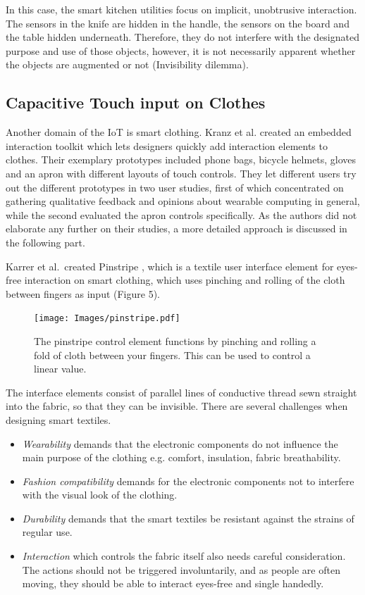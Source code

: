 In this case, the smart kitchen utilities focus on implicit, unobtrusive interaction.
The sensors in the knife are hidden in the handle, the sensors on the board and the table hidden underneath.
Therefore, they do not interfere with the designated purpose and use of those objects, however, it is not necessarily apparent whether the objects are augmented or not (Invisibility dilemma).

\subsection{Capacitive Touch input on Clothes}
\label{sec:touchInputOnClothes}
Another domain of the IoT is smart clothing. 
Kranz et al. created an embedded interaction toolkit which lets designers quickly add interaction elements to clothes.
Their exemplary prototypes included phone bags, bicycle helmets, gloves and an apron with different layouts of touch controls.
They let different users try out the different prototypes in two user studies, first of which concentrated on gathering qualitative feedback and opinions about wearable computing in general, while the second evaluated the apron controls specifically.
As the authors did not elaborate any further on their studies, a more detailed approach is discussed in the following part.

Karrer et al.\ created Pinstripe \cite{karrer11}, which is a textile user interface element for eyes-free interaction on smart clothing, which uses pinching and rolling of the cloth between fingers as input (Figure 5).
\begin{figure}[!t]
	\centering
	\texttt{[image: Images/pinstripe.pdf]}
	\caption{The pinstripe control element functions by pinching and rolling a fold of cloth between your fingers. This can be used to control a linear value. \cite{karrer11}}
	\label{fig:pinstripe}
\end{figure}
The interface elements consist of parallel lines of conductive thread sewn straight into the fabric, so that they can be invisible.
There are several challenges when designing smart textiles.
\begin{itemize}
	\item \emph{Wearability} demands that the electronic components do not influence the main purpose of the clothing e.g. comfort, insulation, fabric breathability. 
	\item \emph{Fashion compatibility} demands for the electronic components not to interfere with the visual look of the clothing. 
	\item \emph{Durability} demands that the smart textiles be resistant against the strains of regular use.
	\item \emph{Interaction} which controls the fabric itself also needs careful consideration.
	The actions should not be triggered involuntarily, and as people are often moving, they should be able to interact eyes-free and single handedly.
\end{itemize} 

